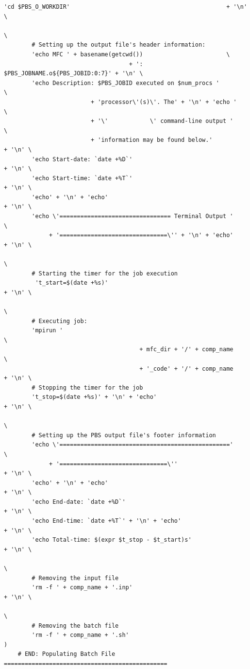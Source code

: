 \documentclass[11pt]{article}
\begin{document}
\begin{lstlisting}[style=BashInputStyle]
        'cd $PBS_O_WORKDIR'                                             + '\n' \
                                                                               \
        # Setting up the output file's header information:
        'echo MFC ' + basename(getcwd())                        \
                                    + ': $PBS_JOBNAME.o${PBS_JOBID:0:7}' + '\n' \
        'echo Description: $PBS_JOBID executed on $num_procs '                 \
                         + 'processor\'(s)\'. The' + '\n' + 'echo '            \
                         + '\'            \' command-line output '             \
                         + 'information may be found below.'            + '\n' \
        'echo Start-date: `date +%D`'                                   + '\n' \
        'echo Start-time: `date +%T`'                                   + '\n' \
        'echo' + '\n' + 'echo'                                          + '\n' \
        'echo \'================================ Terminal Output '             \
             + '===============================\'' + '\n' + 'echo'      + '\n' \
                                                                               \
        # Starting the timer for the job execution
         't_start=$(date +%s)'                                          + '\n' \
                                                                               \
        # Executing job:
        'mpirun '                                                              \
                                       + mfc_dir + '/' + comp_name             \
                                       + '_code' + '/' + comp_name      + '\n' \
        # Stopping the timer for the job
        't_stop=$(date +%s)' + '\n' + 'echo'                            + '\n' \
                                                                               \
        # Setting up the PBS output file's footer information
        'echo \'================================================='             \
             + '===============================\''                      + '\n' \
        'echo' + '\n' + 'echo'                                          + '\n' \
        'echo End-date: `date +%D`'                                     + '\n' \
        'echo End-time: `date +%T`' + '\n' + 'echo'                     + '\n' \
        'echo Total-time: $(expr $t_stop - $t_start)s'                  + '\n' \
                                                                               \
        # Removing the input file
        'rm -f ' + comp_name + '.inp'                                   + '\n' \
                                                                               \
        # Removing the batch file
        'rm -f ' + comp_name + '.sh'                                           )
    # END: Populating Batch File ===============================================
    

\end{lstlisting}
\end{document}
